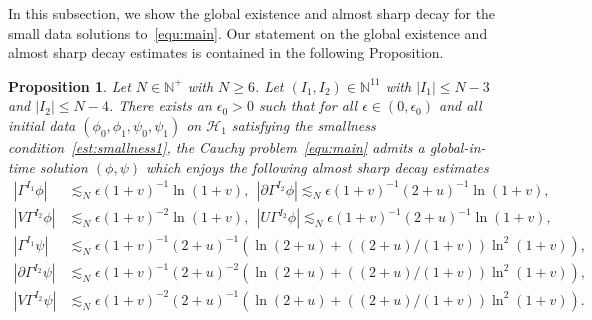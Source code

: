 \documentclass[a4paper,reqno]{amsart}
\newtheorem{proposition}[theorem]{Proposition}
\theoremstyle{definition}
\numberwithin{equation}{section}
\begin{document}
   In this subsection, we show the global existence and almost sharp decay for the small data solutions to~\eqref{equ:main}. Our statement on the global existence and almost sharp decay estimates is contained in the following Proposition.
\begin{proposition}\label{prop:existence}
 Let $N\in \mathbb{N}^{+}$ with $N\ge 6$.
 Let $(I_{1},I_{2})\in \mathbb{N}^{11}$ with $|I_{1}|\le N-3$ and $|I_{2}|\le N-4$.
 There exists an $\epsilon_{0}>0$ such that for all $\epsilon\in (0,\epsilon_{0})$ and all initial data $(\phi_{0},\phi_1,\psi_{0},\psi_1)$ on $\mathcal{H}_{1}$ satisfying the smallness condition~\eqref{est:smallness1}, 
 the Cauchy problem~\eqref{equ:main} admits a global-in-time solution $(\phi,\psi)$ which enjoys the following almost sharp decay estimates 
 \begin{equation*}
 \begin{aligned}
\left|\Gamma^{I_{1}}\phi\right|&\lesssim_{N} \epsilon (1+v)^{-1}\ln(1+v), \ \
\left|\partial\Gamma^{I_{2}}\phi\right|\lesssim_{N} \epsilon (1+v)^{-1}(2+u)^{-1}\ln (1+v),\\
\left|V\Gamma^{I_{2}}\phi\right|&\lesssim_{N}\epsilon (1+v)^{-2}\ln (1+v),\ \
\left|U\Gamma^{I_{2}}\phi\right|\lesssim_{N} \epsilon (1+v)^{-1}(2+u)^{-1}\ln (1+v),\\
\left|\Gamma^{I_{1}}\psi\right|&\lesssim_{N} \epsilon  (1+v)^{-1}(2+u)^{-1}\left(\ln (2+u) + ((2+u)/(1+v))\ln^{2} (1+v)\right),\\
\left|\partial\Gamma^{I_{2}}\psi\right|&\lesssim_{N} \epsilon  (1+v)^{-1}(2+u)^{-2}\left(\ln (2+u) + ((2+u)/(1+v))\ln^{2} (1+v)\right),\\
\left|V\Gamma^{I_{2}}\psi\right|&\lesssim_{N} \epsilon  (1+v)^{-2}(2+u)^{-1}\left(\ln (2+u) + ((2+u)/(1+v))\ln^{2} (1+v)\right).
     \end{aligned}
 \end{equation*}
\end{proposition}
\end{document}
